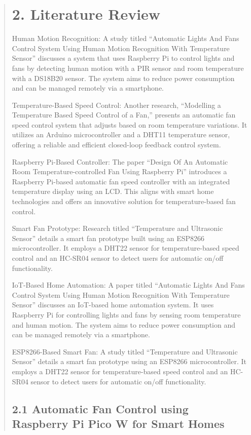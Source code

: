 \documentclass[12pt]{report}
\begin{document}
	\begin{quote}
		\section{2. Literature Review}
		Human Motion Recognition: A study titled “Automatic Lights And Fans Control System Using Human Motion Recognition With Temperature Sensor” discusses a system that uses Raspberry Pi to control lights and fans by detecting human motion with a PIR sensor and room temperature with a DS18B20 sensor. The system aims to reduce power consumption and can be managed remotely via a smartphone.
		
		Temperature-Based Speed Control: Another research, “Modelling a Temperature Based Speed Control of a Fan,” presents an automatic fan speed control system that adjusts based on room temperature variations. It utilizes an Arduino microcontroller and a DHT11 temperature sensor, offering a reliable and efficient closed-loop feedback control system.
		
		Raspberry Pi-Based Controller: The paper “Design Of An Automatic Room Temperature-controlled Fan Using Raspberry Pi” introduces a Raspberry Pi-based automatic fan speed controller with an integrated temperature display using an LCD. This aligns with smart home technologies and offers an innovative solution for temperature-based fan control.
		
		Smart Fan Prototype: Research titled “Temperature and Ultrasonic Sensor” details a smart fan prototype built using an ESP8266 microcontroller. It employs a DHT22 sensor for temperature-based speed control and an HC-SR04 sensor to detect users for automatic on/off functionality.
		
		IoT-Based Home Automation: A paper titled “Automatic Lights And Fans Control System Using Human Motion Recognition With Temperature Sensor” discusses an IoT-based home automation system. It uses Raspberry Pi for controlling lights and fans by sensing room temperature and human motion. The system aims to reduce power consumption and can be managed remotely via a smartphone.
		
		ESP8266-Based Smart Fan: A study titled “Temperature and Ultrasonic Sensor” details a smart fan prototype using an ESP8266 microcontroller. It employs a DHT22 sensor for temperature-based speed control and an HC-SR04 sensor to detect users for automatic on/off functionality.
		\clearpage
		
		\subsection{2.1 Automatic Fan Control using Raspberry Pi Pico W for Smart Homes}
		

\end{quote}
\end{document}

